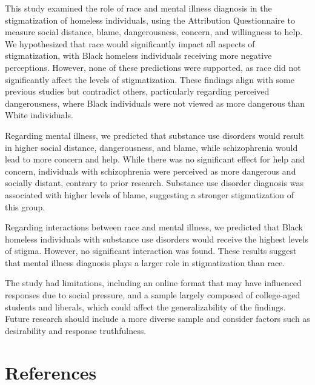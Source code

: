 \documentclass[
  man,
  floatsintext,
  longtable,
  nolmodern,
  notxfonts,
  notimes,
  colorlinks=true,linkcolor=blue,citecolor=blue,urlcolor=blue]{apa7}
\begin{document}
This study examined the role of race and mental illness diagnosis in the
stigmatization of homeless individuals, using the Attribution
Questionnaire to measure social distance, blame, dangerousness, concern,
and willingness to help. We hypothesized that race would significantly
impact all aspects of stigmatization, with Black homeless individuals
receiving more negative perceptions. However, none of these predictions
were supported, as race did not significantly affect the levels of
stigmatization. These findings align with some previous studies but
contradict others, particularly regarding perceived dangerousness, where
Black individuals were not viewed as more dangerous than White
individuals.

Regarding mental illness, we predicted that substance use disorders
would result in higher social distance, dangerousness, and blame, while
schizophrenia would lead to more concern and help. While there was no
significant effect for help and concern, individuals with schizophrenia
were perceived as more dangerous and socially distant, contrary to prior
research. Substance use disorder diagnosis was associated with higher
levels of blame, suggesting a stronger stigmatization of this group.

Regarding interactions between race and mental illness, we predicted
that Black homeless individuals with substance use disorders would
receive the highest levels of stigma. However, no significant
interaction was found. These results suggest that mental illness
diagnosis plays a larger role in stigmatization than race.

The study had limitations, including an online format that may have
influenced responses due to social pressure, and a sample largely
composed of college-aged students and liberals, which could affect the
generalizability of the findings. Future research should include a more
diverse sample and consider factors such as desirability and response
truthfulness.

\section{References}\label{references}
\end{document}
